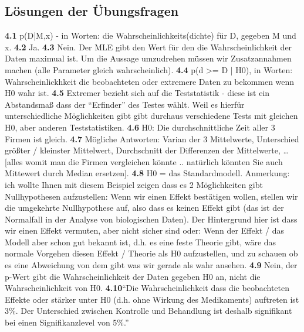 \documentclass[a4paper,twoside]{tufte-book}\usepackage[]{graphicx}\usepackage[]{color}
\begin{document}
\begin{appendices}

\vspace{1cm}
\begin{fullwidth}

\chapter{Lösungen der Übungsfragen}

\textbf{4.1} p(D|M,x) - in Worten: die Wahrscheinlichkeits(dichte) für D, gegeben M und x.
\textbf{4.2} Ja.
\textbf{4.3} Nein. Der MLE gibt den Wert für den die Wahrscheinlichkeit der Daten maximual ist. Um die Aussage umzudrehen müssen wir Zusatzannahmen machen (alle Parameter gleich wahrscheinlich).
\textbf{4.4} p(d >= D | H0), in Worten: Wahrscheinlickhkeit die beobachteten oder extremere Daten zu bekommen wenn H0 wahr ist.
\textbf{4.5} Extremer bezieht sich auf die Teststatistik - diese ist ein Abstandsmaß dass der “Erfinder” des Testes wählt. Weil es hierfür unterschiedliche Möglichkeiten gibt gibt durchaus verschiedene Tests mit gleichen H0, aber anderen Teststatistiken.
\textbf{4.6} H0: Die durchschnittliche Zeit aller 3 Firmen ist gleich.
\textbf{4.7} Mögliche Antworten: Varian der 3 Mittelwerte, Unterschied größter / kleinster Mittelwert, Durchschnitt der Differenzen der Mittelwerte, … [alles womit man die Firmen vergleichen könnte .. natürlich könnten Sie auch Mittewert durch Median ersetzen].
\textbf{4.8} H0 = das Standardmodell.
Anmerkung: ich wollte Ihnen mit diesem Beispiel zeigen dass es 2 Möglichkeiten gibt Nullhypothesen aufzustellen: Wenn wir einen Effekt bestätigen wollen, stellen wir die umgekehrte Nullhypothese auf, also dass es keinen Effekt gibt (das ist der Normalfall in der Analyse von biologischen Daten). Der Hintergrund hier ist dass wir einen Effekt vermuten, aber nicht sicher sind oder: Wenn der Effekt / das Modell aber schon gut bekannt ist, d.h. es eine feste Theorie gibt, wäre das normale Vorgehen diesen Effekt / Theorie als H0 aufzustellen, und zu schauen ob es eine Abweichung von dem gibt was wir gerade als wahr ansehen.
\textbf{4.9} Nein, der p-Wert gibt die Wahrscheinlichkeit der Daten gegeben H0 an, nicht die Wahrscheinlichkeit von H0.
\textbf{4.10}“Die Wahrscheinlichkeit dass die beobachteten Effekte oder stärker unter H0 (d.h. ohne Wirkung des Medikaments) auftreten ist 3\%. Der Unterschied zwischen Kontrolle und Behandlung ist deshalb signifikant bei einen Signifikanzlevel von 5\%.”

\end{fullwidth}
\end{appendices}
\end{document}
